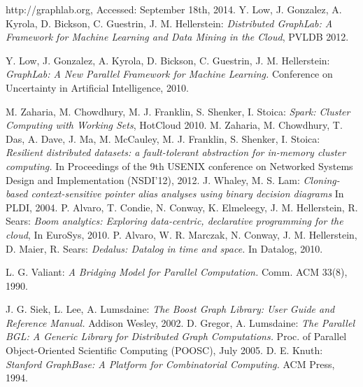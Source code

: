 \begin{thebibliography}{99}
 http://graphlab.org, Accessed: September 18th, 2014.
 Y. Low, J. Gonzalez, A. Kyrola, D. Bickson, C. Guestrin, J. M. Hellerstein: \textit{Distributed GraphLab: A Framework for Machine Learning and Data Mining in the Cloud}, PVLDB 2012.

 Y. Low, J. Gonzalez, A. Kyrola, D. Bickson, C. Guestrin, J. M. Hellerstein: \textit{GraphLab: A New Parallel Framework for Machine Learning.} Conference on Uncertainty in Artificial Intelligence, 2010.

 M. Zaharia, M. Chowdhury, M. J. Franklin, S. Shenker, I. Stoica: \textit{Spark: Cluster Computing with Working Sets}, HotCloud 2010.
 M. Zaharia, M. Chowdhury, T. Das, A. Dave, J. Ma, M. McCauley, M. J. Franklin, S. Shenker, I. Stoica: \textit{Resilient distributed datasets: a fault-tolerant abstraction for in-memory cluster computing.} In Proceedings of the 9th USENIX conference on Networked Systems Design and Implementation (NSDI'12), 2012.
 J. Whaley, M. S. Lam: \textit{Cloning-based context-sensitive pointer alias analyses using binary decision diagrams} In PLDI, 2004.
 P. Alvaro, T. Condie, N. Conway, K. Elmeleegy, J. M. Hellerstein, R. Sears: \textit{Boom analytics: Exploring data-centric, declarative programming for the cloud}, In EuroSys, 2010.
 P. Alvaro, W. R. Marczak, N. Conway, J. M. Hellerstein, D. Maier, R. Sears: \textit{Dedalus: Datalog in time and space.} In Datalog, 2010.

 L. G. Valiant: \emph{A Bridging Model for Parallel Computation.} Comm. ACM 33(8), 1990.

 J. G. Siek, L. Lee, A. Lumsdaine: \textit{The Boost Graph Library: User Guide and Reference Manual.} Addison Wesley, 2002.
 D. Gregor, A. Lumsdaine: \textit{The Parallel BGL: A Generic Library for Distributed Graph Computations.} Proc. of Parallel Object-Oriented Scientific Computing (POOSC), July 2005.
 D. E. Knuth: \textit{Stanford GraphBase: A Platform for Combinatorial Computing.} ACM Press, 1994.


\end{thebibliography}
